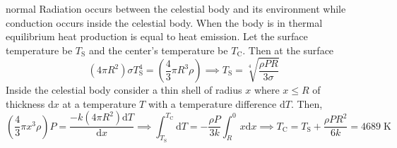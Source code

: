 \begin{solution}{normal}
Radiation occurs between the celestial body and its environment while conduction occurs inside the celestial body. When the body is in thermal equilibrium heat production is equal to heat emission.
Let the surface temperature be $T_{\text{S}}$ and the center’s temperature be $T_{\text{C}}$. Then at the surface $$\left(4\pi R^2\right)\sigma T_{\text{S}}^4=\left(\frac{4}{3} \pi R^3\rho\right) \implies T_{\text{S}} = \sqrt [4] {\frac{\rho PR}{3\sigma}} $$
Inside the celestial body consider a thin shell of radius $x$ where $x\leq R$ of thickness $\text{d}x$ at a temperature $T$ with a temperature difference $\text{d}T$. Then, 
$$\left(\frac{4}{3} \pi x^3 \rho \right)P = \frac{-k(4\pi R^2) \text{d}T}{\text{d}x} \implies \int_{T_{\text{S}}}^{T_{\text{C}}} \text{d}T = -\frac{\rho P}{3k}\int_{R}^0 x\text{d}x \implies T_{\text{C}} = T_{\text{S}} + \frac{\rho PR^2}{6k} = 4689\;\mathrm{K} $$
\end{solution}